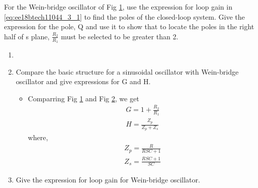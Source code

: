 For the Wein-bridge oscillator of Fig \ref{fig:ee18btech11044_3_tikz_1}, use the expression for loop gain in  \eqref{eq:ee18btech11044_3_1}  to find the poles of the closed-loop system. Give the expression for the pole, Q and use it to show that to locate the poles in the right half of s plane, $\frac{R_2}{R_1}$ must be selected to be greater than 2. 

\begin{figure}[!hbt]
	\begin{center}
			\resizebox{\columnwidth}{!}{}
	\end{center}
\caption{}
\label{fig:ee18btech11044_3_tikz_1}
\end{figure}

\begin{enumerate}[label=\arabic*.,ref=\theenumi]
\item


\item Compare the basic structure for a sinusoidal oscillator with Wein-bridge oscillator and give expressions for G and H. 

\solution
\begin{itemize}
    \item Comparring Fig \ref{fig:ee18btech11044_3_tikz_1} and Fig \ref{fig:ee18btech11044_3_tikz_2}, we get
\begin{align}
G = 1+\frac{R_2}{R_1} \\
H = \frac{Z_p}{Z_p + Z_s}
\end{align}
where,
\begin{align}
    Z_p = \frac{R}{RSC+1} \\
    Z_s = \frac{RSC+1}{SC}
\end{align}
\end{itemize}



\begin{figure}[!hbt]
	\begin{center}
		\resizebox{\columnwidth}{!}{}
	\end{center}
\caption{}
\label{fig:ee18btech11044_3_tikz_2}
\end{figure} 





\item
Give the expression for loop gain for Wein-bridge oscillator. 


\end{enumerate}
